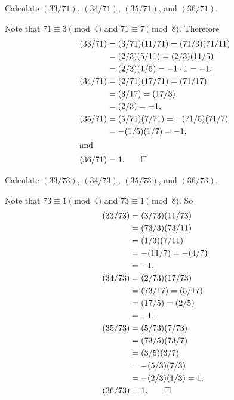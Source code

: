  Calculate $(33/71)$, $(34/71)$, $(35/71)$, and $(36/71)$.
\begin{solution}
  Note that $71\equiv3\pmod4$ and $71\equiv7\pmod8$. Therefore
  \begin{align*}
    (33/71) &= (3/71)(11/71)
              = (71/3)(71/11) \\
            &= (2/3)(5/11)
              = (2/3)(11/5) \\
            &= (2/3)(1/5)
              = -1\cdot1 = -1, \\
    (34/71) &= (2/71)(17/71)
              = (71/17) \\
            &= (3/17)
              = (17/3) \\
            &= (2/3)
              = -1, \\
    (35/71) &= (5/71)(7/71)
              = -(71/5)(71/7) \\
            &= -(1/5)(1/7)
              = -1, \\
    \intertext{and}
    (36/71) &= 1. \qedhere
  \end{align*}
\end{solution}

 Calculate $(33/73)$, $(34/73)$, $(35/73)$, and $(36/73)$.
\begin{solution}
  Note that $73\equiv1\pmod4$ and $73\equiv1\pmod8$. So
  \begin{align*}
    (33/73) &= (3/73)(11/73) \\
            &= (73/3)(73/11) \\
            &= (1/3)(7/11) \\
            &= -(11/7) = -(4/7) \\
            &= -1, \\
    (34/73) &= (2/73)(17/73) \\
            &= (73/17) = (5/17) \\
            &= (17/5) = (2/5) \\
            &= -1, \\
    (35/73) &= (5/73)(7/73) \\
            &= (73/5)(73/7) \\
            &= (3/5)(3/7) \\
            &= -(5/3)(7/3) \\
            &= -(2/3)(1/3)
              = 1, \\
    (36/73) &= 1. \qedhere
  \end{align*}
\end{solution}
